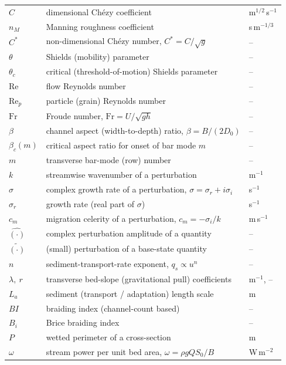 \documentclass[11pt,a4paper]{report}
\theoremstyle{definition}
\theoremstyle{plain}
\theoremstyle{remark}
\newcommand{\Fr}{\mathrm{Fr}}
\renewcommand{\Re}{\mathrm{Re}}
\begin{document}
\begin{longtable}{@{}p{2.6cm}p{9.6cm}p{2.4cm}@{}}
$C$ & dimensional Chézy coefficient & m$^{1/2}$\,s$^{-1}$ \\
$n_M$ & Manning roughness coefficient & s\,m$^{-1/3}$ \\
$C^*$ & non-dimensional Chézy number, $C^*=C/\sqrt g$ & -- \\
$\theta$ & Shields (mobility) parameter & -- \\
$\theta_c$ & critical (threshold-of-motion) Shields parameter & -- \\
$\Re$ & flow Reynolds number & -- \\
$\Re_p$ & particle (grain) Reynolds number & -- \\
$\Fr$ & Froude number, $\Fr=U/\sqrt{gh}$ & -- \\
$\beta$ & channel aspect (width-to-depth) ratio, $\beta = B/(2D_0)$ & -- \\
$\beta_c(m)$ & critical aspect ratio for onset of bar mode $m$ & -- \\
$m$ & transverse bar-mode (row) number & -- \\
$k$ & streamwise wavenumber of a perturbation & m$^{-1}$ \\
$\sigma$ & complex growth rate of a perturbation, $\sigma=\sigma_r+i\sigma_i$ & s$^{-1}$ \\
$\sigma_r$ & growth rate (real part of $\sigma$) & s$^{-1}$ \\
$c_m$ & migration celerity of a perturbation, $c_m=-\sigma_i/k$ & m\,s$^{-1}$ \\
$\widehat{(\cdot)}$ & complex perturbation amplitude of a quantity & -- \\
$\tilde{(\cdot)}$ & (small) perturbation of a base-state quantity & -- \\
$n$ & sediment-transport-rate exponent, $q_s\propto u^n$ & -- \\
$\lambda,\ r$ & transverse bed-slope (gravitational pull) coefficients & m$^{-1}$, -- \\
$L_a$ & sediment (transport / adaptation) length scale & m \\
$BI$ & braiding index (channel-count based) & -- \\
$B_i$ & Brice braiding index & -- \\
$P$ & wetted perimeter of a cross-section & m \\
$\omega$ & stream power per unit bed area, $\omega=\rho g Q S_0/B$ & W\,m$^{-2}$ \\
\bottomrule
\end{longtable}

\end{document}
